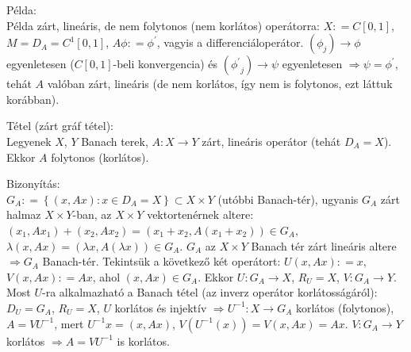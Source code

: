 \documentclass[12pt,a4paper]{scrartcl}
\newenvironment{tetel}{}{}
\newenvironment{bizonyitas}{}{}
\newenvironment{pelda}{}{}
\begin{document}
\begin{pelda}

Példa:\\
Példa zárt, lineáris, de nem folytonos (nem korlátos) operátorra:
\(X: = C\left\lbrack 0,1 \right\rbrack\),
\(M = D_{A} = C^{1}\left\lbrack 0,1 \right\rbrack\),
\(A\phi: = \phi^{\prime}\), vagyis a differenciáloperátor.
\(\left. \left( \phi_{j} \right)\rightarrow\phi \right.\) egyenletesen
(\(C\left\lbrack 0,1 \right\rbrack\)-beli konvergencia) és
\(\left. \left( {\phi^{\prime}}_{j} \right)\rightarrow\psi \right.\)
egyenletesen \(\left. \Rightarrow\psi = \phi^{\prime} \right.\), tehát
\(A\) valóban zárt, lineáris (de nem korlátos, így nem is folytonos, ezt
láttuk korábban).

\end{pelda}

\begin{tetel}

Tétel (zárt gráf tétel):\\
Legyenek \(X\), \(Y\) Banach terek, \(\left. A:X\rightarrow Y \right.\)
zárt, lineáris operátor (tehát \(D_{A} = X\)). Ekkor \(A\) folytonos
(korlátos).

\end{tetel}

\begin{bizonyitas}

Bizonyítás:\\
\(G_{A}: = \left\{ {\left( {x,Ax} \right):x \in D_{A} = X} \right\} \subset X \times Y\)
(utóbbi Banach-tér), ugyanis \(G_{A}\) zárt halmaz \(X \times Y\)-ban,
az \(X \times Y\) vektortenérnek altere:
\(\left( {x_{1},Ax_{1}} \right) + \left( {x_{2},Ax_{2}} \right) = \left( {x_{1} + x_{2},A\left( {x_{1} + x_{2}} \right)} \right) \in G_{A}\),
\(\lambda\left( {x,Ax} \right) = \left( {\lambda x,A\left( {\lambda x} \right)} \right) \in G_{A}\).
\(G_{A}\) az \(X \times Y\) Banach tér zárt lineáris altere
\(\left. \Rightarrow G_{A} \right.\) Banach-tér. Tekintsük a következő
két operátort: \(U\left( {x,Ax} \right): = x\),
\(V\left( {x,Ax} \right): = Ax\), ahol
\(\left( {x,Ax} \right) \in G_{A}\). Ekkor
\(\left. U:G_{A}\rightarrow X \right.\), \(R_{U} = X\),
\(\left. V:G_{A}\rightarrow Y \right.\). Most \(U\)-ra alkalmazható a
Banach tétel (az inverz operátor korlátosságáról): \(D_{U} = G_{A}\),
\(R_{U} = X\), \(U\) korlátos és injektív
\(\left. \Rightarrow U^{- 1}:X\rightarrow G_{A} \right.\) korlátos
(folytonos), \(A = VU^{- 1}\), mert
\(U^{- 1}x = \left( {x,Ax} \right)\),
\(V\left( {U^{- 1}\left( x \right)} \right) = V\left( {x,Ax} \right) = Ax\).
\(\left. V:G_{A}\rightarrow Y \right.\) korlátos
\(\left. \Rightarrow A = VU^{- 1} \right.\) is korlátos.

\end{bizonyitas}
\end{document}
